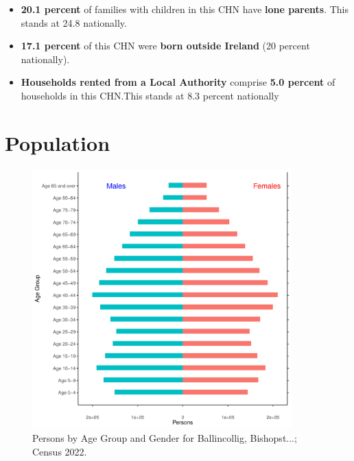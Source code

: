 \documentclass{article}
\begin{document}
\begin{itemize}
\item \textbf{20.1 percent} of families with children in this CHN have \textbf{lone parents}. This stands at 24.8 nationally.

\item \textbf{17.1 percent} of this CHN were \textbf{born outside Ireland} (20 percent nationally).

\item \textbf{Households rented from a Local Authority} comprise \textbf{5.0 percent} of households in this CHN.This stands at 8.3 percent nationally

\end{itemize}

\pagebreak

\section{Population} 
\label{sect:Pop}

\begin{figure}[h]
	\centering
	\includegraphics[width = 100mm]{../figures/PyramidPlot.pdf}
	\caption{Persons by Age Group and Gender for Ballincollig, Bishopst...; Census 2022.}
	\label{fig:2ae19629-1a6a-13a3-e055-000000000001}
	\end{figure}
\end{document}
